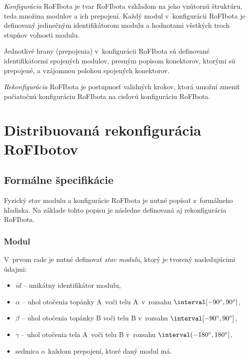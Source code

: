 \documentclass[
  printed, %
  oneside, %
  notable,   %
  nolof,     %
  nolot,     %
]{fithesis3}
\begin{document}
\textit{Konfigurácia} RoFIbota je tvar RoFIbota vzhľadom na jeho vnútornú štruktúru, teda množina modulov a ich prepojení. Každý modul v~konfigurácii RoFIbota je definovaný jedinečným identifikátorom modulu a hodnotami všetkých troch stupňov voľnosti modulu. 

Jednotlivé hrany (prepojenia) v~konfigurácii RoFIbota sú definované identifikátormi spojených modulov, presným popisom konektorov, ktorými sú prepojené, a vzájomnou polohou spojených konektorov. 

\textit{Rekonfigurácia} RoFIbota je postupnosť validných krokov, ktorá u\-mož\-ní zmeniť počiatočnú konfiguráciu RoFIbota na cieľovú konfiguráciu RoFIbota. 






\chapter{Distribuovaná rekonfigurácia RoFIbotov}
\section{Formálne špecifikácie}
\label{sec:formalSpec}
Fyzický stav modulu a konfigurácie RoFIbota je nutné popísať z~formálneho hľadiska. Na základe tohto popisu je následne definovaná aj rekonfigurácia RoFIbota. 

\subsection{Modul}
\label{sec:formalSpecModul}
V~prvom rade je nutné definovať \textit{stav modulu}, ktorý je tvorený nasledujúcimi údajmi: 
\begin{itemize}
    \item \textit{id} -- unikátny identifikátor modulu, 
    \item $\alpha$ -- uhol otočenia topánky A~voči telu A~v~rozsahu $\interval[{-90\degree, 90\degree}]$,
    \item $\beta$ -- uhol otočenia topánky B voči telu B v~rozsahu $\interval[{-90\degree, 90\degree}]$,
    \item $\gamma$ -- uhol otočenia tela A~voči telu B v~rozsahu $\interval({-180\degree, 180\degree}]$,
    \item sedmica o~každom prepojení, ktoré daný modul má. 
\end{itemize} 
\end{document}

